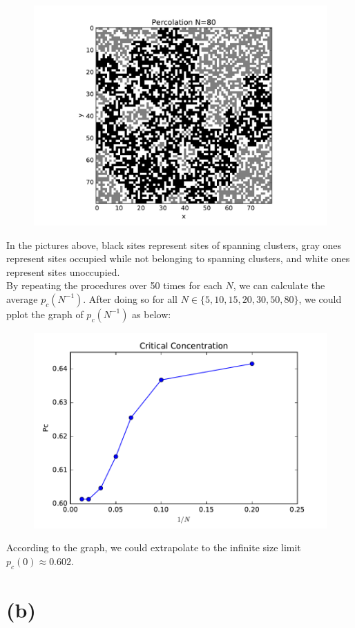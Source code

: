 \documentclass[12pt]{article}
\begin{document}
\begin{figure}[H]
  \includegraphics[width=\linewidth]{percolation_80.pdf}
  \label{delta02}
\endminipage\hfill
\end{figure}
In the pictures above, black sites represent sites of spanning clusters, gray ones represent sites occupied while not belonging to spanning clusters, and white ones represent sites unoccupied.\\
\indent By repeating the procedures over 50 times for each $N$, we can calculate the average $p_c(N^{-1})$. After doing so for all $N\in\{5, 10, 15, 20, 30, 50, 80\}$, we could pplot the graph of $p_c(N^{-1})$ as below:
\begin{figure}[H]
\includegraphics{Critical.pdf}
\end{figure}
According to the graph, we could extrapolate to the infinite size limit $p_c(0)\approx0.602$.
\section{(b)}
\end{document}
